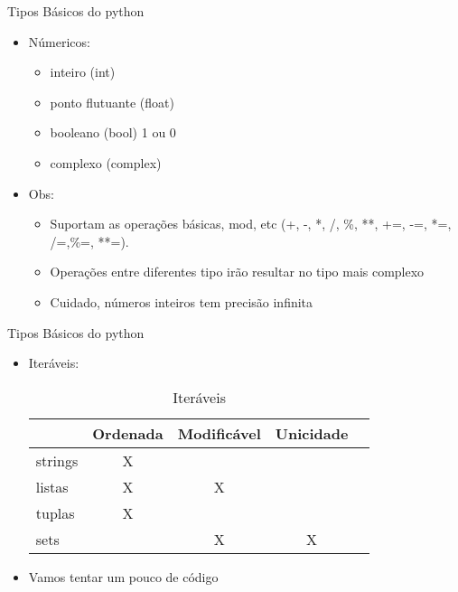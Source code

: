 \begin{frame}{Tipos Básicos do python}
\begin{itemize}
	\item Númericos:
	\begin{itemize}
		\item inteiro (int)
		\item ponto flutuante (float)
		\item booleano (bool) 1 ou 0
		\item complexo (complex)
	\end{itemize}
\end{itemize}
\begin{itemize}
		\item Obs:
		\begin{itemize}
			\item Suportam as operações básicas, mod, etc (+, -, *, /, \%, **, +=, -=, *=, /=,\%=, **=).
			\item Operações entre diferentes tipo irão resultar no tipo mais complexo
			\item Cuidado, números inteiros tem precisão infinita
		\end{itemize}
\end{itemize}
\end{frame}

\begin{frame}{Tipos Básicos do python}
\begin{itemize}
	\item Iteráveis:
	\begin{table}[]
		\centering
		\caption{Iteráveis}
		\label{my-label}
		\begin{tabular}{|l|c|c|l|l|}
			\hline
			\multicolumn{1}{|c|}{} & Ordenada              & Modificável           & \multicolumn{1}{c|}{Unicidade}  \\ \hline
			strings                   & \multicolumn{0}{c|}{X} &                           &                       \\ \hline
			listas                 & X                     & X                     &                                          \\ \hline
			tuplas                 & X                     & \multicolumn{1}{l|}{} &                    \\ \hline
			sets                   & \multicolumn{1}{l|}{} & X                     & \multicolumn{1}{c|}{X}                             \\ \hline
		\end{tabular}
	\end{table}
	\item Vamos tentar um pouco de código
\end{itemize}
		\textbf{}
\end{frame}